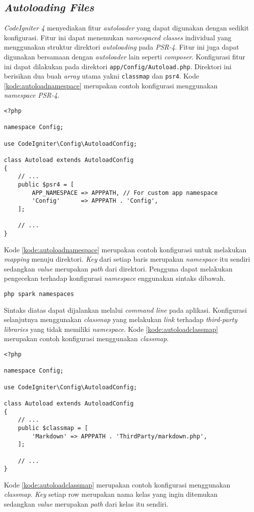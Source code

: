 \subsection{\textit{Autoloading Files}}
\textit{CodeIgniter 4} menyediakan fitur \textit{autoloader} yang dapat digunakan dengan sedikit konfigurasi. Fitur ini dapat menemukan \textit{namespaced classes} individual yang menggunakan struktur direktori \textit{autoloading} pada \textit{PSR-4}. Fitur ini juga dapat digunakan bersamaan dengan \textit{autoloader} lain seperti \textit{composer}. Konfigurasi fitur ini dapat dilakukan pada direktori \texttt{app/Config/Autoload.php}. Direktori ini berisikan dua buah \textit{array} utama yakni \texttt{classmap} dan \texttt{psr4}. Kode \ref{kode:autoloadnamespace} merupakan contoh konfigurasi menggunakan \textit{namespace PSR-4}.
\begin{lstlisting}[caption=Contoh konfigurasi menggunakan \textit{namespace PSR-4}. ,label=kode:autoloadnamespace]
<?php

namespace Config;

use CodeIgniter\Config\AutoloadConfig;

class Autoload extends AutoloadConfig
{
    // ...
    public $psr4 = [
        APP_NAMESPACE => APPPATH, // For custom app namespace
        'Config'      => APPPATH . 'Config',
    ];

    // ...
}
\end{lstlisting}
Kode \ref{kode:autoloadnamespace} merupakan contoh konfigurasi untuk melakukan \textit{mapping} menuju direktori. \textit{Key} dari setiap baris merupakan \textit{namespace} itu sendiri sedangkan \textit{value} merupakan \textit{path} dari direktori. Pengguna dapat melakukan pengecekan terhadap konfigurasi \textit{namespace} enggunakan sintaks dibawah.
\begin{center}
	\verb|php spark namespaces|
\end{center}
Sintaks diatas dapat dijalankan melalui \textit{command line} pada aplikasi. Konfigurasi selanjutnya menggunakan \textit{classmap} yang melakukan \textit{link} terhadap \textit{third-party libraries} yang tidak memiliki \textit{namespace}. Kode \ref{kode:autoloadclassmap} merupakan contoh konfigurasi menggunakan \textit{classmap}.

\begin{lstlisting}[caption=Contoh konfigurasi menggunakan \textit{classmap}. ,label=kode:autoloadclassmap]
<?php

namespace Config;

use CodeIgniter\Config\AutoloadConfig;

class Autoload extends AutoloadConfig
{
    // ...
    public $classmap = [
        'Markdown' => APPPATH . 'ThirdParty/markdown.php',
    ];

    // ...
}
\end{lstlisting}
Kode \ref{kode:autoloadclassmap} merupakan contoh konfigurasi menggunakan \textit{classmap}. \textit{Key} setiap row merupakan nama kelas yang ingin ditemukan sedangkan \textit{value} merupakan \textit{path} dari kelas itu sendiri.

